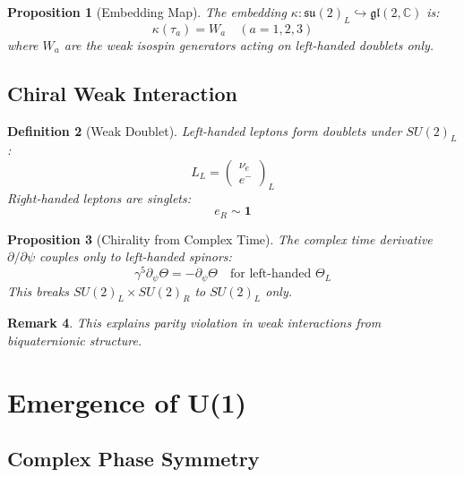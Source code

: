 \documentclass[12pt]{article}
\newtheorem{definition}{Definition}[section]
\newtheorem{proposition}[definition]{Proposition}
\newtheorem{remark}[definition]{Remark}
\newcommand{\C}{\mathbb{C}}
\newcommand{\su}{\mathfrak{su}}
\newcommand{\gl}{\mathfrak{gl}}
\begin{document}
\begin{proposition}[Embedding Map]
The embedding $\kappa: \su(2)_L \hookrightarrow \gl(2,\C)$ is:
\begin{equation}
\kappa(\tau_a) = W_a \quad (a=1,2,3)
\end{equation}
where $W_a$ are the weak isospin generators acting on left-handed doublets only.
\end{proposition}

\subsection{Chiral Weak Interaction}

\begin{definition}[Weak Doublet]
Left-handed leptons form doublets under $SU(2)_L$:
\begin{equation}
L_L = \begin{pmatrix} \nu_e \\ e^- \end{pmatrix}_L
\end{equation}
Right-handed leptons are singlets:
\begin{equation}
e_R \sim \mathbf{1}
\end{equation}
\end{definition}

\begin{proposition}[Chirality from Complex Time]
The complex time derivative $\partial/\partial\psi$ couples only to left-handed spinors:
\begin{equation}
\gamma^5 \partial_\psi \Theta = -\partial_\psi \Theta \quad \text{for left-handed } \Theta_L
\end{equation}
This breaks $SU(2)_L \times SU(2)_R$ to $SU(2)_L$ only.
\end{proposition}

\begin{remark}
This explains parity violation in weak interactions from biquaternionic structure.
\end{remark}

\section{Emergence of U(1)}

\subsection{Complex Phase Symmetry}
\end{document}
